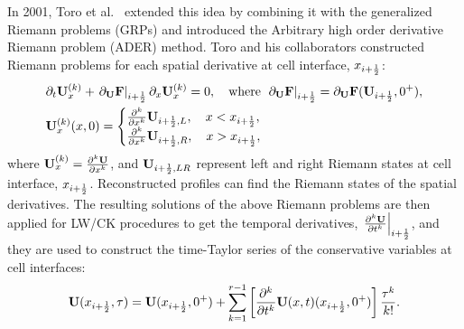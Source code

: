 In 2001, Toro et al.~\cite{toro2001towards} extended this idea
by combining it with the generalized Riemann problems (GRPs)
and introduced the Arbitrary high order derivative Riemann problem (ADER) method.
Toro and his collaborators constructed Riemann problems for each spatial derivative at cell interface, \( x_{\iph} \):
\begin{equation}\label{eq:toro_ader_dudx}
    \begin{split}
        &\pd{\bU^{(k)}_{x}}{t} + \left. \pd{\bF}{\bU} \right|_{\iph} \pd{\bU^{(k)}_{x}}{x} = 0, \quad \text{where } \left. \pd{\bF}{\bU} \right|_{\iph} = \pd{\bF}{\bU}(\bU_{\iph}, 0^{+}), \\
        &\bU^{(k)}_{x} (x, 0) =
        \begin{cases}
            \frac{\partial^{k}}{\partial x^{k}} \bU_{\iph, L}, \quad x < x_{\iph}, \\
            \frac{\partial^{k}}{\partial x^{k}} \bU_{\iph, R}, \quad x > x_{\iph},
        \end{cases}
    \end{split}
\end{equation}
where \( \bU^{(k)}_{x} = \frac{\partial^{k} \bU}{\partial x^{k}} \), and
\( \bU_{\iph, LR} \) represent left and right Riemann states at cell interface, \( x_{\iph} \).
Reconstructed profiles can find the Riemann states of the spatial derivatives.
The resulting solutions of the above Riemann problems
are then applied for LW/CK procedures to get the temporal derivatives, \( \left. \frac{\partial^{k} \bU}{\partial t^{k}} \right|_{\iph} \),
and they are used to construct the time-Taylor series of the conservative variables at cell interfaces:
\begin{equation}\label{eq:toro_ader}
    \bU (x_{\iph}, \tau) = \bU(x_{\iph}, 0^{+}) + \sum_{k = 1}^{r -1} \left[ \frac{\partial^{k}}{\partial t^{k}} \bU (x, t) (x_{\iph}, 0^{+}) \right] \frac{\tau^{k}}{k!}.
\end{equation}

